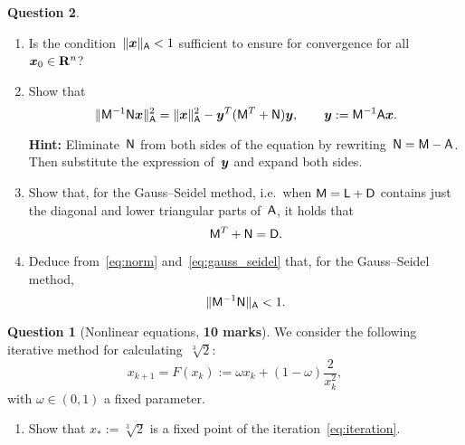 \documentclass[11pt]{article}
\theoremstyle{definition}
\newtheorem{question}{Question}
\theoremstyle{remark}
\theoremstyle{plain}%
\begin{document}
\begin{question}
\begin{enumerate}
        \item
            \mymark
            Is the condition~$\lVert\mathbf{\boldsymbol{x}}\rVert_{\mathsf A} < 1$ sufficient to ensure for convergence for all~$\mathbf{\boldsymbol{x}}_0 \in \mathbf R^n$?

        \item
            Show that
            \begin{equation}
                \label{eq:norm}
                \lVert\mathsf M^{-1} \mathsf N \mathbf{\boldsymbol{x}}\rVert_{\mathsf A}^2
                = \lVert\mathbf{\boldsymbol{x}}\rVert_{\mathsf A}^2 - \mathbf{\boldsymbol{y}}^T (\mathsf M^T + \mathsf N) \mathbf{\boldsymbol{y}},
                \qquad \mathbf{\boldsymbol{y}} :=  \mathsf M^{-1} \mathsf A \mathbf{\boldsymbol{x}}.
            \end{equation}

            \textbf{Hint: } Eliminate~$\mathsf N$ from both sides of the equation by rewriting~$\mathsf N = \mathsf M - \mathsf A$.
            Then substitute the expression of~$\mathbf{\boldsymbol{y}}$ and expand both sides.


        \item
            \mymark
            Show that, for the Gauss--Seidel method,
            i.e.\ when $\mathsf M = \mathsf L + \mathsf D$ contains just the diagonal and lower triangular parts of~$\mathsf A$,
            it holds that
            \begin{equation}
                \label{eq:gauss_seidel}
                \mathsf M^T + \mathsf N = \mathsf D.
            \end{equation}

        \item
            Deduce from~\eqref{eq:norm} and~\eqref{eq:gauss_seidel} that,
            for the Gauss--Seidel method,
            \[
                \lVert\mathsf M^{-1} \mathsf N\rVert_{\mathsf A} < 1.
            \]
    \end{enumerate}

\newpage
\begin{question}
    [Nonlinear equations, \textbf{10 marks}]
    We consider the following iterative method for calculating~$\sqrt[3]{2}$:
    \begin{equation}
        \label{eq:iteration}
        x_{k+1} = F(x_k) :=  \omega x_k + (1 - \omega) \frac{2}{x_k^2},
    \end{equation}
    with $\omega \in (0, 1)$ a fixed parameter.
    \begin{enumerate}
        \item
            \mymark
            Show that $x_* := \sqrt[3]{2}$ is a fixed point of the iteration~\eqref{eq:iteration}.



\end{enumerate}
\end{question}
\end{question}
\end{document}
